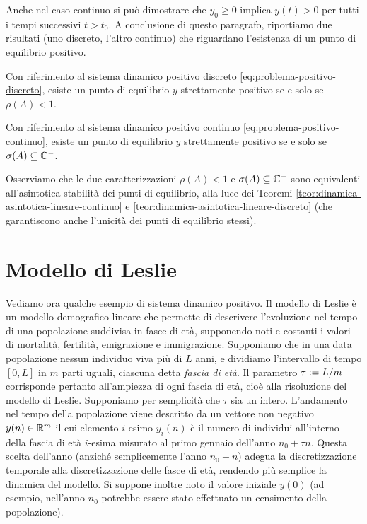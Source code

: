 \noindent Anche nel caso continuo si può dimostrare che $y_0 \geq 0$ implica
$y(t) > 0$ per tutti i tempi successivi $t > t_0$. A conclusione di questo paragrafo,
riportiamo due risultati (uno discreto, l'altro continuo) che riguardano l'esistenza
di un punto di equilibrio positivo.

\begin{teor} \label{teor:equilibrio-sistema-dinamico-positivo-discreto}
Con riferimento al sistema dinamico positivo discreto
\eqref{eq:problema-positivo-discreto}, esiste un punto di equilibrio $\bar{y}$
strettamente positivo se e solo se $\rho(A) < 1$.
\end{teor}

\begin{teor} \label{teor:equilibrio-sistema-dinamico-positivo-continuo}
Con riferimento al sistema dinamico positivo continuo
\eqref{eq:problema-positivo-continuo}, esiste un punto di equilibrio $\bar{y}$
strettamente positivo se e solo se $\sigma(A) \subseteq \mathbb{C}^-$.
\end{teor}

\noindent Osserviamo che le due caratterizzazioni $\rho(A) < 1$ e
$\sigma(A) \subseteq \mathbb{C}^-$ sono equivalenti all'asintotica stabilità
dei punti di equilibrio, alla luce dei Teoremi
\ref{teor:dinamica-asintotica-lineare-continuo}
e \ref{teor:dinamica-asintotica-lineare-discreto}
(che garantiscono anche l'unicità dei punti di equilibrio stessi).

\section{Modello di Leslie}

Vediamo ora qualche esempio di sistema dinamico positivo.
Il modello di Leslie è un modello demografico lineare che permette
di descrivere l'evoluzione nel tempo di una popolazione suddivisa
in fasce di età, supponendo noti e costanti i valori di mortalità,
fertilità, emigrazione e immigrazione.
Supponiamo che in una data popolazione nessun individuo viva
più di $L$ anni, e dividiamo l'intervallo di tempo $[0,L]$ in $m$
parti uguali, ciascuna detta \emph{fascia di età}.
Il parametro $\tau \vcentcolon= L/m$ corrisponde pertanto all'ampiezza di ogni fascia
di età, cioè alla risoluzione del modello di Leslie. Supponiamo per semplicità
che $\tau$ sia un intero. L'andamento nel tempo della popolazione viene descritto
da un vettore non negativo $y(n) \in \mathbb{R}^m$ il cui elemento $i$-esimo $y_i(n)$
è il numero di individui all'interno della fascia di età $i$-esima misurato
al primo gennaio dell'anno $n_0 + \tau n$. Questa scelta dell'anno
(anziché semplicemente l'anno $n_0 + n$) adegua la discretizzazione temporale
alla discretizzazione delle fasce di età, rendendo più semplice la dinamica del modello.
Si suppone inoltre noto il valore iniziale $y(0)$ (ad esempio, nell'anno
$n_0$ potrebbe essere stato effettuato un censimento della popolazione).


